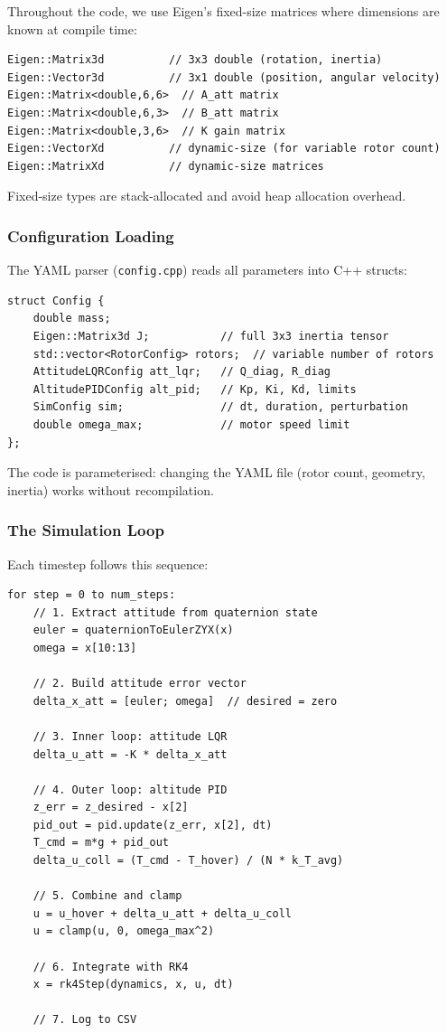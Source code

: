 \documentclass[12pt, a4paper]{article}
\begin{document}
Throughout the code, we use Eigen's fixed-size matrices where dimensions are known at compile time:
\begin{lstlisting}[caption={Typical Eigen types used}]
Eigen::Matrix3d          // 3x3 double (rotation, inertia)
Eigen::Vector3d          // 3x1 double (position, angular velocity)
Eigen::Matrix<double,6,6>  // A_att matrix
Eigen::Matrix<double,6,3>  // B_att matrix
Eigen::Matrix<double,3,6>  // K gain matrix
Eigen::VectorXd          // dynamic-size (for variable rotor count)
Eigen::MatrixXd          // dynamic-size matrices
\end{lstlisting}
Fixed-size types are stack-allocated and avoid heap allocation overhead.

\subsubsection{Configuration Loading}

The YAML parser (\texttt{config.cpp}) reads all parameters into C++ structs:
\begin{lstlisting}[caption={Config struct hierarchy}]
struct Config {
    double mass;
    Eigen::Matrix3d J;           // full 3x3 inertia tensor
    std::vector<RotorConfig> rotors;  // variable number of rotors
    AttitudeLQRConfig att_lqr;   // Q_diag, R_diag
    AltitudePIDConfig alt_pid;   // Kp, Ki, Kd, limits
    SimConfig sim;               // dt, duration, perturbation
    double omega_max;            // motor speed limit
};
\end{lstlisting}
The code is parameterised: changing the YAML file (rotor count, geometry, inertia) works without recompilation.

\subsubsection{The Simulation Loop}

Each timestep follows this sequence:
\begin{lstlisting}[caption={Simulation loop pseudocode}]
for step = 0 to num_steps:
    // 1. Extract attitude from quaternion state
    euler = quaternionToEulerZYX(x)
    omega = x[10:13]

    // 2. Build attitude error vector
    delta_x_att = [euler; omega]  // desired = zero

    // 3. Inner loop: attitude LQR
    delta_u_att = -K * delta_x_att

    // 4. Outer loop: altitude PID
    z_err = z_desired - x[2]
    pid_out = pid.update(z_err, x[2], dt)
    T_cmd = m*g + pid_out
    delta_u_coll = (T_cmd - T_hover) / (N * k_T_avg)

    // 5. Combine and clamp
    u = u_hover + delta_u_att + delta_u_coll
    u = clamp(u, 0, omega_max^2)

    // 6. Integrate with RK4
    x = rk4Step(dynamics, x, u, dt)

    // 7. Log to CSV
\end{lstlisting}
\end{document}
